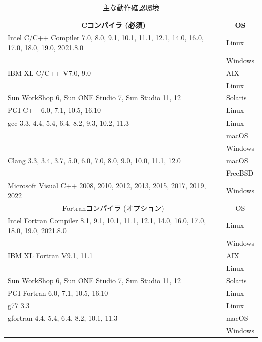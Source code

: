 \documentclass[a4paper]{jarticle}
\begin{document}
\begin{table}[htbp]
\caption{主な動作確認環境}
\label{platforms}
\begin{center}
{\small
 \begin{tabular}{l|l}
\hline
\multicolumn{1}{c|}{Cコンパイラ (必須) } & \multicolumn{1}{c}{OS} \\
\hline
Intel C/C++ Compiler 7.0, 8.0, 9.1, 10.1, 11.1, 12.1, 14.0, 16.0, 17.0, 18.0, 19.0, 2021.8.0 & Linux \\
                                                     & Windows  \\
\hline
IBM XL C/C++ V7.0, 9.0                     & AIX   \\
                                           & Linux \\
\hline
Sun WorkShop 6, Sun ONE Studio 7, Sun Studio 11, 12  & Solaris \\
\hline
PGI C++ 6.0, 7.1, 10.5, 16.10              & Linux \\
\hline
gcc 3.3, 4.4, 5.4, 6.4, 8.2, 9.3, 10.2, 11.3     & Linux \\
                                           & macOS \\
                                           & Windows \\
\hline
Clang 3.3, 3.4, 3.7, 5.0, 6.0, 7.0, 8.0, 9.0, 10.0, 11.1, 12.0 & macOS \\
                                           & FreeBSD \\
\hline
Microsoft Visual C++ 2008, 2010, 2012, 2013, 2015, 2017, 2019, 2022 & Windows \\
\hline
\hline
\multicolumn{1}{c|}{Fortranコンパイラ (オプション) } & \multicolumn{1}{c}{OS} \\
\hline
Intel Fortran Compiler 8.1, 9.1, 10.1, 11.1, 12.1, 14.0, 16.0, 17.0, 18.0, 19.0, 2021.8.0 & Linux \\
                                                  & Windows  \\
\hline
IBM XL Fortran V9.1, 11.1                  & AIX     \\
                                           & Linux   \\
\hline
Sun WorkShop 6, Sun ONE Studio 7, Sun Studio 11, 12  & Solaris \\
\hline
PGI Fortran 6.0, 7.1, 10.5, 16.10          & Linux \\
\hline
g77 3.3                                    & Linux \\
gfortran 4.4, 5.4, 6.4, 8.2, 10.1, 11.3    & macOS \\
                                           & Windows \\
\hline
\end{tabular}
}
\end{center}
\end{table} 
\end{document}
